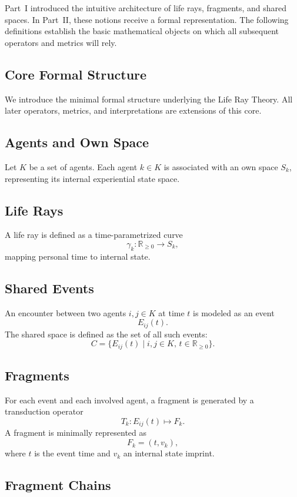 \documentclass[12pt,a4paper]{article}
\begin{document}
Part~I introduced the intuitive architecture of life rays, fragments, and shared 
spaces. In Part~II, these notions receive a formal representation. The following 
definitions establish the basic mathematical objects on which all subsequent 
operators and metrics will rely.

\subsection{Core Formal Structure}

We introduce the minimal formal structure underlying the Life Ray Theory. 
All later operators, metrics, and interpretations are extensions of this core.

\subsection{Agents and Own Space}

Let $K$ be a set of agents.  
Each agent $k \in K$ is associated with an own space $S_k$, representing its internal experiential state space.

\subsection{Life Rays}

A life ray is defined as a time-parametrized curve
\[
\gamma_k : \mathbb{R}_{\ge 0} \to S_k,
\]
mapping personal time to internal state.

\subsection{Shared Events}

An encounter between two agents $i,j \in K$ at time $t$ is modeled as an event
\[
E_{ij}(t).
\]
The shared space is defined as the set of all such events:
\[
C = \{ E_{ij}(t) \mid i,j \in K,\, t \in \mathbb{R}_{\ge 0} \}.
\]

\subsection{Fragments}

For each event and each involved agent, a fragment is generated by a transduction operator
\[
T_k : E_{ij}(t) \mapsto F_k.
\]
A fragment is minimally represented as
\[
F_k = (t, v_k),
\]
where $t$ is the event time and $v_k$ an internal state imprint.

\subsection{Fragment Chains}
\end{document}
